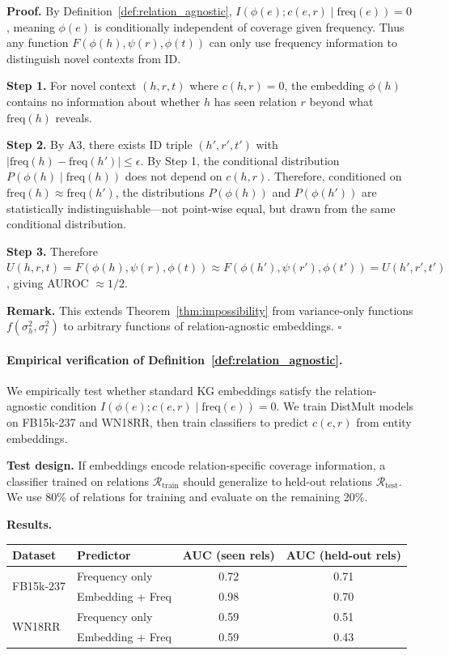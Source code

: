 \documentclass{article}
\newcommand{\freq}{\text{freq}}
\begin{document}
\textbf{Proof.} By Definition~\ref{def:relation_agnostic}, $I(\phi(e); c(e,r) \mid \freq(e)) = 0$, meaning $\phi(e)$ is conditionally independent of coverage given frequency. Thus any function $F(\phi(h), \psi(r), \phi(t))$ can only use frequency information to distinguish novel contexts from ID.

\textbf{Step 1.} For novel context $(h,r,t)$ where $c(h,r) = 0$, the embedding $\phi(h)$ contains no information about whether $h$ has seen relation $r$ beyond what $\freq(h)$ reveals.

\textbf{Step 2.} By A3, there exists ID triple $(h',r',t')$ with $|\freq(h) - \freq(h')| \leq \epsilon$. By Step 1, the conditional distribution $P(\phi(h) \mid \freq(h))$ does not depend on $c(h,r)$. Therefore, conditioned on $\freq(h) \approx \freq(h')$, the distributions $P(\phi(h))$ and $P(\phi(h'))$ are statistically indistinguishable---not point-wise equal, but drawn from the same conditional distribution.

\textbf{Step 3.} Therefore $U(h,r,t) = F(\phi(h), \psi(r), \phi(t)) \approx F(\phi(h'), \psi(r'), \phi(t')) = U(h',r',t')$, giving AUROC $\approx 1/2$.

\textbf{Remark.} This extends Theorem~\ref{thm:impossibility} from variance-only functions $f(\sigma^2_h, \sigma^2_t)$ to arbitrary functions of relation-agnostic embeddings. $\square$

\paragraph{Empirical verification of Definition~\ref{def:relation_agnostic}.}
\label{app:def_verification}
We empirically test whether standard KG embeddings satisfy the relation-agnostic condition $I(\phi(e); c(e,r) \mid \freq(e)) = 0$. We train DistMult models on FB15k-237 and WN18RR, then train classifiers to predict $c(e,r)$ from entity embeddings.

\textbf{Test design.} If embeddings encode relation-specific coverage information, a classifier trained on relations $\mathcal{R}_{\text{train}}$ should generalize to held-out relations $\mathcal{R}_{\text{test}}$. We use 80\% of relations for training and evaluate on the remaining 20\%.

\textbf{Results.}
\begin{center}
\small
\begin{tabular}{llcc}
\toprule
Dataset & Predictor & AUC (seen rels) & AUC (held-out rels) \\
\midrule
\multirow{2}{*}{FB15k-237} & Frequency only & 0.72 & 0.71 \\
& Embedding + Freq & 0.98 & 0.70 \\
\midrule
\multirow{2}{*}{WN18RR} & Frequency only & 0.59 & 0.51 \\
& Embedding + Freq & 0.59 & 0.43 \\
\bottomrule
\end{tabular}
\end{center}
\end{document}
